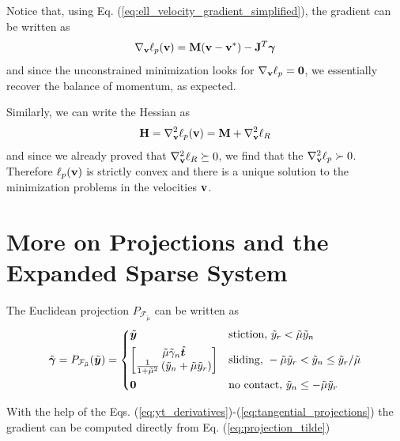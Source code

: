 Notice that, using Eq. (\ref{eq:ell_velocity_gradient_simplified}), the gradient
can be written as
\begin{equation}
	\nabla_{\mathbf{v}}\ell_p({\mathbf{v}}) = {\mathbf{M}}({\mathbf{v}}-{\mathbf{v}}^*) - {\mathbf{J}}^T{\bm\gamma}
\end{equation}
and since the unconstrained minimization looks for $\nabla_{\mathbf{v}}\ell_p={\mathbf{0}}$,
we essentially recover the balance of momentum, as expected.

Similarly, we can write the Hessian as
\begin{equation}
	{\mathbf{H}} = \nabla_{\mathbf{v}}^2\ell_p({\mathbf{v}}) = {\mathbf{M}} + \nabla_{\mathbf{v}}^2\ell_R
\end{equation}
and since we already proved that $\nabla_{\mathbf{v}}^2\ell_R\succeq 0$, we find that
the $\nabla_{\mathbf{v}}^2\ell_p\succ 0$. Therefore $\ell_p({\mathbf{v}})$ is strictly
convex and there is a unique solution to the minimization problems in the
velocities ${\mathbf{v}}$.

\section{More on Projections and the Expanded Sparse System}
\label{app:more_on_projections}

The Euclidean projection $P_{\mathcal{F}_{\tilde{\mu}}}$ can be written as
	\begin{equation}
		\tilde{\bgamma} = P_{\mathcal{F}_{\tilde{\mu}}}(\tilde{\vf{y}}) = 
	\begin{dcases}
		\tilde{\vf{y}}
		& \text{stiction, } \tilde{y}_r < \tilde{\mu} \tilde{y}_n\\
		\begin{bmatrix}
			\tilde{\mu}\tilde{\gamma}_n\hat{\vf{t}}\\
			\frac{1}{1+\tilde\mu^2}\left(\tilde{y}_n +
		\tilde\mu\tilde{y}_r\right)
		\end{bmatrix}
		& \text{sliding, } -\tilde\mu \tilde{y}_r < \tilde{y}_n \leq \tilde{y}_r/\tilde\mu\\
		\vf{0} & \text{no contact, } \tilde{y}_n \leq -\tilde\mu\tilde{y}_r
	\end{dcases}	  
		\label{eq:projection_tilde}
	\end{equation}
	
With the help of the Eqs.
(\ref{eq:yt_derivatives})-(\ref{eq:tangential_projections}) the gradient can be
computed directly from Eq. (\ref{eq:projection_tilde})

